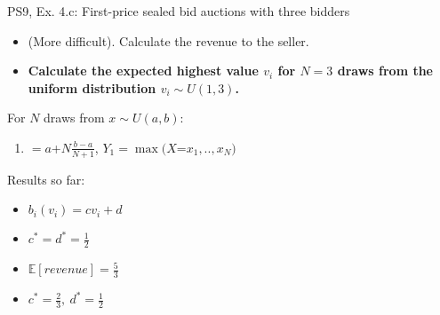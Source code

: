 \begin{frame}{PS9, Ex. 4.c: First-price sealed bid auctions with three bidders}
    \begin{itemize}
      \item[(c)] (More difficult). Calculate the revenue to the seller.
    \end{itemize}
    \vspace{-8pt}
    \begin{multicols}{2}
      \begin{itemize}
        \item[\nth{1} step:] \textbf{Calculate the expected highest value $v_i$ for $N=3$ draws from the uniform distribution $v_i\sim U(1,3)$.}
      \end{itemize}
      \vfill\null\columnbreak
      For $N$ draws from $x\sim U(a, b):$
      \vspace{-6pt}
      \begin{enumerate}
        \item[$\mathbb{E}(Y_1)$] $=a$+$N\frac{b-a}{N+1}$, $Y_1=\max(X$=$x_1,..,x_N)$
      \end{enumerate}
      \vspace{-6pt}
      Results so far:
      \vspace{-6pt}
      \begin{itemize}
        \item[($*$)] $b_i(v_i) = cv_i+d$
        \item[(3.a)] $c^*=d^*=\frac{1}{2}$
        \item[(3.b)] $\mathbb{E}[revenue]=\frac{5}{3}$
        \item[(4.a)] $c^*=\frac{2}{3},\ d^*=\frac{1}{2}$
      \end{itemize}
      \vfill\null
    \end{multicols}
    \vfill\null
\end{frame}

